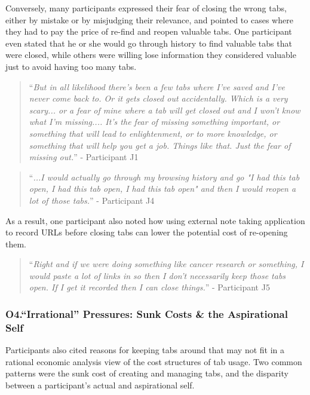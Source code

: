 Conversely, many participants expressed their fear of closing the wrong tabs, either by mistake or by misjudging their relevance, and pointed to cases where they had to pay the price of re-find and reopen valuable tabs. One participant even stated that he or she would go through history to find valuable tabs that were closed, while others were willing lose information they considered valuable just to avoid having too many tabs. 

\begin{quote}
``\emph{But in all likelihood there's been a few tabs where I've saved and I've never come back to. Or it gets closed out accidentally. Which is a very scary... or a fear of mine where a tab will get closed out and I won't know what I'm missing.... It's the fear of missing something important, or something that will lead to enlightenment, or to more knowledge, or something that will help you get a job. Things like that. Just the fear of missing out.}'' - Participant J1
\end{quote}

\begin{quote}
``\emph{...I would actually go through my browsing history and go "I had this tab open, I had this tab open, I had this tab open" and then I would reopen a lot of those tabs.}'' - Participant J4
\end{quote}

As a result, one participant also noted how using external note taking application to record URLs before closing tabs can lower the potential cost of re-opening them.

\begin{quote}
``\emph{Right and if we were doing something like cancer research or something, I would paste a lot of links in so then I don't necessarily keep those tabs open. If I get it recorded then I can close things.}'' - Participant J5 
\end{quote}

\subsubsection{O4.``Irrational'' Pressures: Sunk Costs \& the Aspirational Self}

Participants also cited reasons for keeping tabs around that may not fit in a rational economic analysis view of the cost structures of tab usage. Two common patterns were the sunk cost of creating and managing tabs, and the disparity between a participant's actual and aspirational self.

